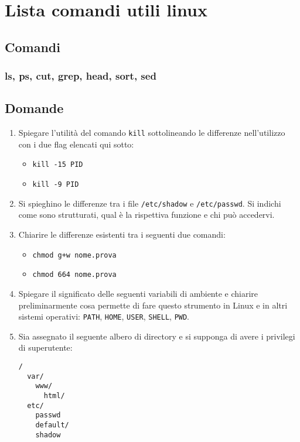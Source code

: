 \documentclass{report}
\begin{document}
\chapter{Lista comandi utili linux}
\section{Comandi}
\subsection{ls, ps, cut, grep, head, sort, sed}
\section{Domande}

\begin{enumerate}
\item Spiegare l’utilità del comando \texttt{kill} sottolineando le differenze nell’utilizzo con i due flag elencati qui sotto:
\begin{itemize}
    \item \texttt{kill -15 PID}
    \item \texttt{kill -9 PID}
\end{itemize}

\item Si spieghino le differenze tra i file \texttt{/etc/shadow} e \texttt{/etc/passwd}. Si indichi come sono strutturati, qual è la rispettiva funzione e chi può accedervi.

\item Chiarire le differenze esistenti tra i seguenti due comandi:
\begin{itemize}
    \item \texttt{chmod g+w nome.prova}
    \item \texttt{chmod 664 nome.prova}
\end{itemize}

\item Spiegare il significato delle seguenti variabili di ambiente e chiarire preliminarmente cosa permette di fare questo strumento in Linux e in altri sistemi operativi:
\texttt{PATH}, \texttt{HOME}, \texttt{USER}, \texttt{SHELL}, \texttt{PWD}.
\newpage
\item Sia assegnato il seguente albero di directory e si supponga di avere i privilegi di superutente:

\begin{verbatim}
/ 
  var/
    www/
      html/
  etc/
    passwd
    default/
    shadow
\end{verbatim}


\end{enumerate}
\end{document}
